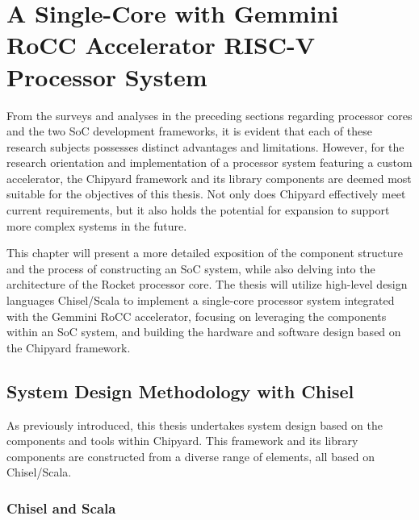 \chapter{A Single-Core with Gemmini RoCC Accelerator RISC-V Processor System}
\label{chap:SingleCoreGemminiRiscVSystem}

From the surveys and analyses in the preceding sections regarding processor cores and the two SoC development frameworks, it is evident that each of these research subjects possesses distinct advantages and limitations. However, for the research orientation and implementation of a processor system featuring a custom accelerator, the Chipyard framework and its library components are deemed most suitable for the objectives of this thesis. Not only does Chipyard effectively meet current requirements, but it also holds the potential for expansion to support more complex systems in the future.

This chapter will present a more detailed exposition of the component structure and the process of constructing an SoC system, while also delving into the architecture of the Rocket processor core. The thesis will utilize high-level design languages Chisel/Scala to implement a single-core processor system integrated with the Gemmini RoCC accelerator, focusing on leveraging the components within an SoC system, and building the hardware and software design based on the Chipyard framework.

\section{System Design Methodology with Chisel}
\label{sec:design_methodology_chisel}

As previously introduced, this thesis undertakes system design based on the components and tools within Chipyard. This framework and its library components are constructed from a diverse range of elements, all based on Chisel/Scala.

\subsection{Chisel and Scala}
\label{subsec:chisel_scala}

